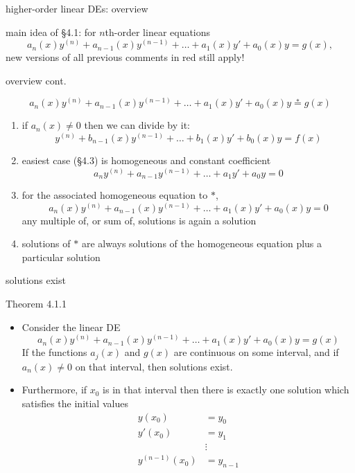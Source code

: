 \documentclass{beamer}
\begin{document}
\begin{frame}{higher-order linear DEs: overview}

main idea of \S4.1:  for $n$th-order linear equations
\begin{equation*}
    a_n(x) y^{(n)} + a_{n-1}(x) y^{(n-1)} + \dots + a_1(x) y' + a_0(x) y = g(x),
\end{equation*}
\alert{new versions of all previous comments in red still apply!}
\end{frame}


\begin{frame}{overview cont.}

\begin{equation*}
    a_n(x) y^{(n)} + a_{n-1}(x) y^{(n-1)} + \dots + a_1(x) y' + a_0(x) y \stackrel{\ast}{=} g(x)
\end{equation*}
\begin{enumerate}
\item if $a_n(x)\ne 0$ then we can divide by it:
    $$y^{(n)} + b_{n-1}(x) y^{(n-1)} + \dots + b_1(x) y' + b_0(x) y = f(x)$$
\item easiest case (\S4.3) is homogeneous and constant coefficient
    $$a_n y^{(n)} + a_{n-1} y^{(n-1)} + \dots + a_1 y' + a_0 y = 0$$
\item for the associated homogeneous equation to $\ast$,
\begin{equation*}
    a_n(x) y^{(n)} + a_{n-1}(x) y^{(n-1)} + \dots + a_1(x) y' + a_0(x) y = 0
\end{equation*}
any multiple of, or sum of, solutions is again a solution
\item solutions of $\ast$ are always solutions of the homogeneous equation plus a particular solution
\end{enumerate}
\end{frame}


\begin{frame}{solutions exist}

\begin{block}{Theorem 4.1.1}
\begin{itemize}
\item Consider the linear DE
\begin{equation*}
    a_n(x) y^{(n)} + a_{n-1}(x) y^{(n-1)} + \dots + a_1(x) y' + a_0(x) y = g(x)
\end{equation*}
If the functions $a_j(x)$ and $g(x)$ are continuous on some interval, and if $a_n(x) \ne 0$ on that interval, then solutions exist.
\item Furthermore, if $x_0$ is in that interval then there is exactly one solution which satisfies the initial values
\begin{align*}
y(x_0) &= y_0 \\
y'(x_0) &= y_1 \\
 &\vdots \\
y^{(n-1)}(x_0) &= y_{n-1}
\end{align*}
\end{itemize}
\end{block}
\end{frame}
\end{document}
